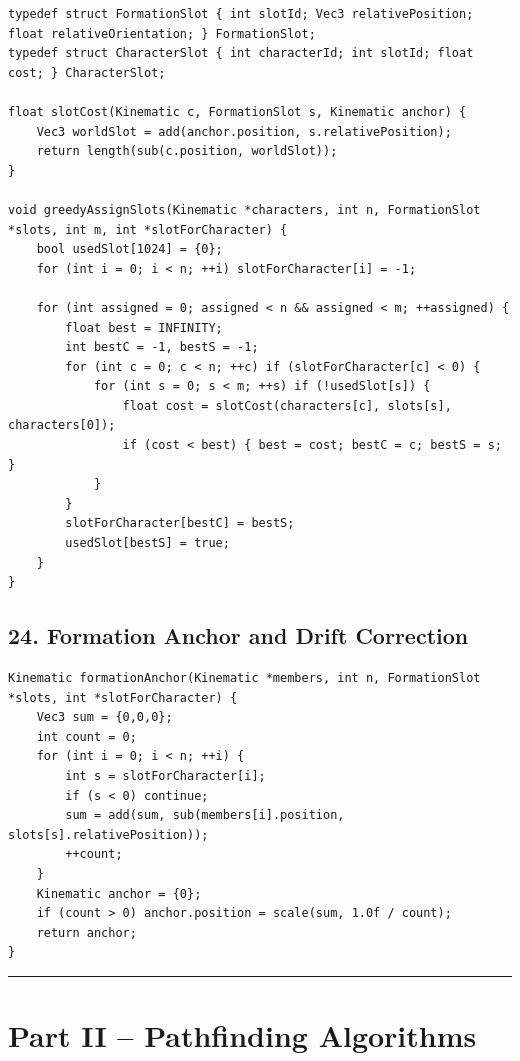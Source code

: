 \documentclass[10pt,letterpaper]{article}
\begin{document}
\begin{verbatim}
typedef struct FormationSlot { int slotId; Vec3 relativePosition; float relativeOrientation; } FormationSlot;
typedef struct CharacterSlot { int characterId; int slotId; float cost; } CharacterSlot;

float slotCost(Kinematic c, FormationSlot s, Kinematic anchor) {
    Vec3 worldSlot = add(anchor.position, s.relativePosition);
    return length(sub(c.position, worldSlot));
}

void greedyAssignSlots(Kinematic *characters, int n, FormationSlot *slots, int m, int *slotForCharacter) {
    bool usedSlot[1024] = {0};
    for (int i = 0; i < n; ++i) slotForCharacter[i] = -1;

    for (int assigned = 0; assigned < n && assigned < m; ++assigned) {
        float best = INFINITY;
        int bestC = -1, bestS = -1;
        for (int c = 0; c < n; ++c) if (slotForCharacter[c] < 0) {
            for (int s = 0; s < m; ++s) if (!usedSlot[s]) {
                float cost = slotCost(characters[c], slots[s], characters[0]);
                if (cost < best) { best = cost; bestC = c; bestS = s; }
            }
        }
        slotForCharacter[bestC] = bestS;
        usedSlot[bestS] = true;
    }
}
\end{verbatim}

\subsection*{24. Formation Anchor and Drift Correction}
{}

\begin{verbatim}
Kinematic formationAnchor(Kinematic *members, int n, FormationSlot *slots, int *slotForCharacter) {
    Vec3 sum = {0,0,0};
    int count = 0;
    for (int i = 0; i < n; ++i) {
        int s = slotForCharacter[i];
        if (s < 0) continue;
        sum = add(sum, sub(members[i].position, slots[s].relativePosition));
        ++count;
    }
    Kinematic anchor = {0};
    if (count > 0) anchor.position = scale(sum, 1.0f / count);
    return anchor;
}
\end{verbatim}

\medskip\hrule\medskip

\clearpage
\section*{Part II -- Pathfinding Algorithms}
\end{document}

